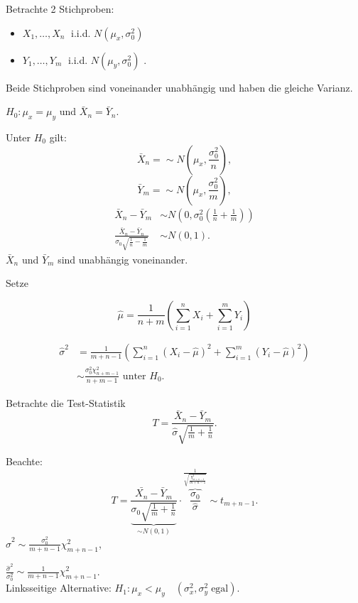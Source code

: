 \documentclass{tstextbook}
\begin{document}
\begin{example}
	
	Betrachte 2 Stichproben: 
	\begin{itemize}
		\item $ X_1,\ldots,X_n \;$ i.i.d. $ N\left(\mu_x, \sigma_0^2\right) $ 
		\item $ Y_1,\ldots,Y_m \;$ i.i.d. $ N\left(\mu_y, \sigma_0^2\right) $ .
	\end{itemize}

	Beide Stichproben sind voneinander unabhängig und haben die gleiche Varianz.
	
	$ H_0 \colon \mu_x = \mu_y $ und $ \bar{X}_n = \bar{Y}_n $.
	
	Unter $ H_0 $ gilt: 
	\[
	\bar{X}_n=\sim N\left(\mu_x,\frac{\sigma_0^2}{n}\right),
	\]
	\[
	\bar{Y}_m=\sim N\left(\mu_x,\frac{\sigma_0^2}{m}\right),
	\]
		\[
	\begin{aligned}
	    \bar{X}_n - \bar{Y}_m & \sim N\left(0, \sigma_0^2\left(\frac{1}{n}+\frac{1}{m}\right)\right) \\
	    \frac{\bar{X}_n-\bar{Y}_n}{\sigma_0\sqrt{\frac{1}{n}-\frac{1}{m}}} & \sim N(0,1).
	\end{aligned}
	\]
	$ \bar{X}_n $ und $ \bar{Y}_m $ sind unabhängig voneinander.
	
	Setze 
	
	\[
		\hat{\mu} = \frac{1}{n+m}\left( \sum_{i=1}^n X_i + \sum_{i=1}^m Y_i \right)
	\]
	
	\[
	\begin{aligned}
	    \hat{\sigma}^2 & = \frac{1}{m+n-1}\left(\sum_{i=1}^{n}(X_i-\hat{\mu})^2+\sum_{i=1}^{m}(Y_i-\hat{\mu})^2\right) \\
	    & \sim \frac{\sigma_0^2 \chi_{n+m-1}^2}{n+m-1} \text{ unter } H_0.
	\end{aligned}
	\]
	
	Betrachte die Test-Statistik
	\[
	T=\frac{\bar{X}_n-\bar{Y}_m}{\hat{\sigma}\sqrt{\frac{1}{m}+\frac{1}{n}}}.
	\]
	
	Beachte: 
	\[
	T = \frac{\bar{X_n}-\bar{Y}_m}{\underbrace{\sigma_0\sqrt{\frac{1}{m}+\frac{1}{n}}}_{\sim N(0,1)}} \cdot \overbrace{\frac{\sigma_0}{\hat{\sigma}}}^{\frac{1}{\sqrt{\frac{\chi^2_{m+n-1}}{m+n-1}}}} \sim t_{m+n-1}.
	\]
	$ \hat{\sigma}^2 \sim \frac{\sigma_0^2}{m+n-1} \chi^2_{m+n-1} $, 
	
	$ \frac{\hat{\sigma}^2}{\sigma_0^2} \sim \frac{1}{m+n-1} \chi^2_{m+n-1} $. \\
	
	Linksseitige Alternative: $ H_1\colon \mu_x < \mu_y \quad (\sigma_x^2, \sigma_y^2 \; \text{egal}) $. 
	

\end{example}
\end{document}
